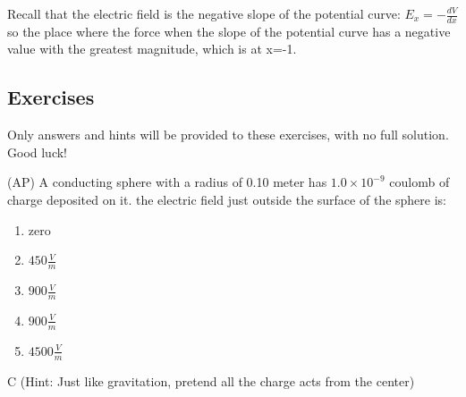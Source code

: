 \begin{solution}

Recall that the electric field is the negative slope of the potential curve: $E_x=-\frac{dV}{dx}$ so the place where the force when the slope of the potential curve has a negative value with the greatest magnitude, which is at x=-1.
\end{solution}




\newpage
\subsection*{Exercises}
Only answers and hints will be provided to these exercises, with no full solution. Good luck!\\


\begin{question}
(AP) A conducting sphere with a radius of 0.10 meter has $1.0 \times 10^{-9}$ coulomb of charge deposited on it. the electric field just outside the surface of the sphere is:
\begin{multicols}{5}
\begin{enumerate}[label=(\alph*)]
    \item zero
    \item $450 \frac{V}{m}$
    \item $900 \frac{V}{m}$
    \item $900 \frac{V}{m}$
    \item $4500 \frac{V}{m}$
\end{enumerate}
\end{multicols}

\end{question}

\begin{solution}
C (Hint: Just like gravitation, pretend all the charge acts from the center)
\end{solution}


